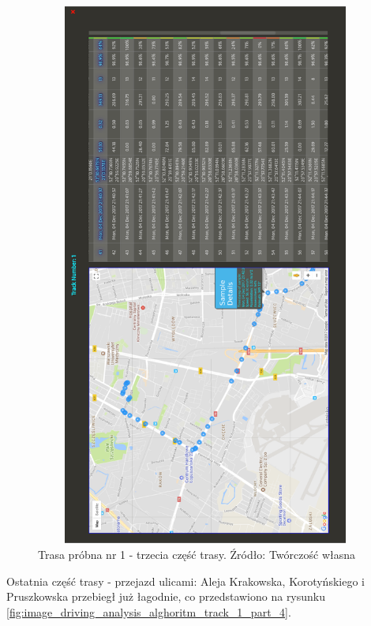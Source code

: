 \begin{figure}[H]
	\centering
	\includegraphics[height=18cm, width=13cm]{img/driving_analysis/test_track_part_3.png}
	\caption{Trasa próbna nr 1 - trzecia część trasy. Źródło: Twórczość własna}
	\label{fig:image_driving_analysis_alghoritm_track_1_part_3}
\end{figure}

Ostatnia część trasy - przejazd ulicami: Aleja Krakowska, Korotyńskiego i Pruszkowska przebiegł już łagodnie, co przedstawiono na rysunku \ref{fig:image_driving_analysis_alghoritm_track_1_part_4}.

